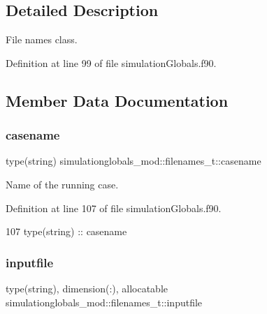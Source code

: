 \subsection{Detailed Description}
File names class. 

Definition at line 99 of file simulation\+Globals.\+f90.



\subsection{Member Data Documentation}
\mbox{\label{structsimulationglobals__mod_1_1filenames__t_a5a53822ea60d4941a19739cacb957469}} 
\subsubsection{\texorpdfstring{casename}{casename}}
{\footnotesize\ttfamily type(string) simulationglobals\+\_\+mod\+::filenames\+\_\+t\+::casename\hspace{0.3cm}{\ttfamily [private]}}



Name of the running case. 



Definition at line 107 of file simulation\+Globals.\+f90.


\begin{DoxyCode}
107         \textcolor{keywordtype}{type}(string) :: casename
\end{DoxyCode}
\mbox{\label{structsimulationglobals__mod_1_1filenames__t_a28b7d9c5da2394c7a3ec6252bd95d9e4}} 
\subsubsection{\texorpdfstring{inputfile}{inputfile}}
{\footnotesize\ttfamily type(string), dimension(\+:), allocatable simulationglobals\+\_\+mod\+::filenames\+\_\+t\+::inputfile\hspace{0.3cm}{\ttfamily [private]}}



